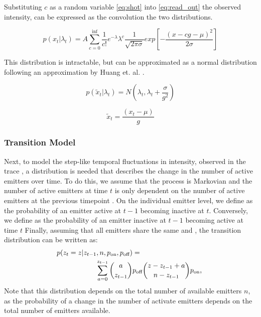 Substituting $c$ as a random variable \eqref{eq:shot} into \eqref{eq:read_out} 
  the observed intensity, can be expressed as the convolution the two distributions.

  \begin{equation*}
    p(x_{t}| \lambda_{t}) = A \sum_{c=0}^{\text{inf}}\frac{1}{c!} e^{-\lambda} \lambda^{c}
    \frac{1}{\sqrt{2\pi\sigma}}
    exp \left[ - \frac{(x - cg - \mu)^2}{2\sigma}\right]
  \end{equation*}

  This distribution is intractable, but can be approximated as a normal distribution 
  following an approximation by Huang et. al. \cite{huang_video-rate_2013}.

  \begin{equation}
    p(\tilde{x}_{t}| \lambda_{t}) = N \left(\lambda_{t}, \lambda_{t} + \frac{\sigma}{g^{2}} \right)
    \label{eq:method:intensity_distribution}
  \end{equation}
  
  \begin{equation*}
    \tilde{x}_{t} = \frac{(x_{t} - \mu)}{g}
  \end{equation*}

\subsubsection{Transition Model}
Next, to model the step-like temporal fluctuations in intensity, observed in the trace \trace, 
a distribution is needed that describes the change in the number of active emitters \states over time. 
%
To do this, we assume that the process is Markovian and the number of active emitters  
at time $t$ is only dependent on the number of active emitters at the previous timepoint .
%
On the individual emitter level, we define \poff as the probability of an emitter active at $t-1$ becoming 
inactive at $t$. Conversely, we define \pon as the probability of an emitter inactive at $t-1$ becoming active at time $t$
%
Finally, assuming that all emitters share the same \poff and \pon, the transition distribution can be written as:
% 
\begin{align}
  \label{eq:method:transition}
  p(z_{t} = z | z_{t-1}, n, \pon, \poff) &=\\
	\sum_{a = 0}^{z_{t-1}}
    {a \choose z_{t-1}}
    &\poff
    {z - z_{t-1} + a \choose \n - z_{t-1}}
    \pon
    \text{,} \notag\
\end{align}
%
Note that this distribution depends on the total number of available emitters
$n$, as the probability of a change in the number of activate emitters
depends on the total number of emitters available.



